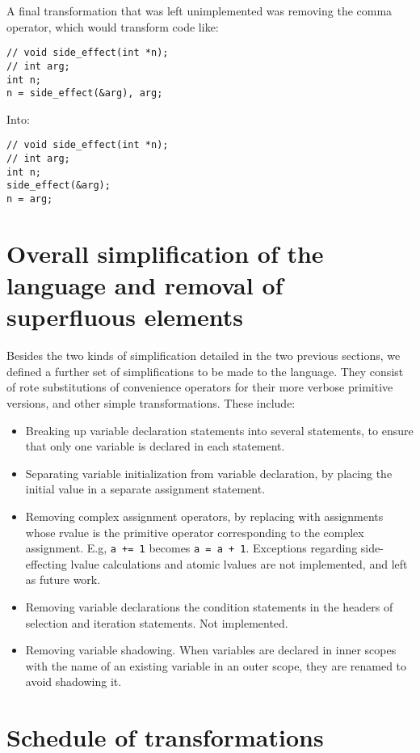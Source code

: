 A final transformation that was left unimplemented was removing the comma operator, which would transform code like:

\begin{lstlisting}
// void side_effect(int *n);
// int arg;
int n;
n = side_effect(&arg), arg;
\end{lstlisting}

Into:

\begin{lstlisting}
// void side_effect(int *n);
// int arg;
int n;
side_effect(&arg);
n = arg;
\end{lstlisting}

\section{Overall simplification of the language and removal of superfluous elements}

Besides the two kinds of simplification detailed in the two previous sections, we defined a further set of simplifications to be made to the language. They consist of rote substitutions of convenience operators for their more verbose primitive versions, and other simple transformations. These include:

\begin{itemize}
    \item Breaking up variable declaration statements into several statements, to ensure that only one variable is declared in each statement.
    \item Separating variable initialization from variable declaration, by placing the initial value in a separate assignment statement.
    \item Removing complex assignment operators, by replacing with assignments whose rvalue is the primitive operator corresponding to the complex assignment. E.g, \verb|a += 1| becomes \verb|a = a + 1|. Exceptions regarding side-effecting lvalue calculations and atomic lvalues are not implemented, and left as future work.
    \item Removing variable declarations the condition statements in the headers of selection and iteration statements. Not implemented.
    \item Removing variable shadowing. When variables are declared in inner scopes with the name of an existing variable in an outer scope, they are renamed to avoid shadowing it.
\end{itemize}

\section{Schedule of transformations}

